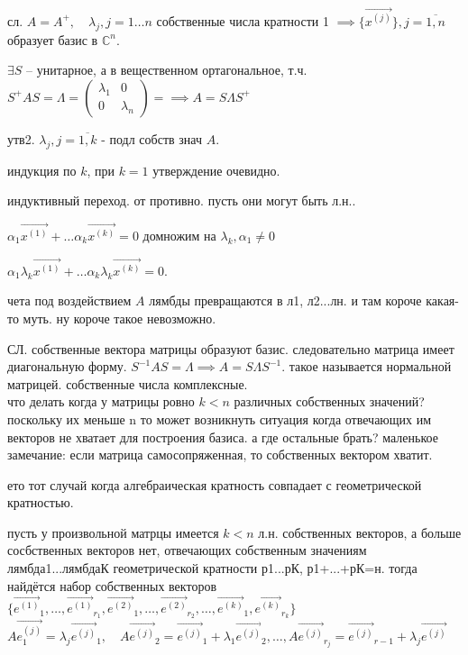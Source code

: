 \documentclass[12pt, a4paper]{article}
\begin{document}
сл. $A = A^+, \quad \lambda_j, j = 1\dotsc n$ собственные числа кратности 1 $\implies \{ \vec{x^{(j)}}\}, j=\overline{1,n}$ образует базис в $\mathbb{C}^n$.

$\exists S $ -- унитарное, а в вещественном ортагональное, т.ч. $S^+AS = \Lambda = \left(\begin{matrix}
\lambda_1 & 0 \\ 0 & \lambda_n
\end{matrix}\right) =\implies A = S\Lambda S^+
$

утв2. $\lambda_j, j=\overline{1, k}$ - подл собств знач $A$. 

индукция по $k$, при $k=1$ утверждение очевидно. 

индуктивный переход. от противно. пусть они могут быть л.н.. 

$\alpha_1 \vec{x^{(1)}} + \dotsc \alpha_k \vec{x^{(k)}} = 0$ домножим на $\lambda_k, \alpha_1 \neq 0$

$\alpha_1 \lambda_k \vec{x^{(1)}} + \dotsc \alpha_k \lambda_k \vec{x^{(k)}} = 0$. 

чета под воздействием $A$ лямбды превращаются в л1, л2...лн. и там короче какая-то муть. ну короче такое невозможно.

СЛ. собственные вектора матрицы образуют базис. следовательно матрица имеет диагональную форму. $S^{-1}AS = \Lambda \implies A = S\Lambda S^{-1}$. такое называется нормальной матрицей. собственные числа комплексные.\\

что делать когда у матрицы ровно $k<n$ различных собственных значений? поскольку их меньше n то может возникнуть ситуация когда отвечающих им векторов не хватает для построения базиса. а где остальные брать? маленькое замечание: если матрица самосопряженная, то собственных вектором хватит.

ето тот случай когда алгебраическая кратность совпадает с геометрической кратностью. 

пусть у произвольной матрцы имеется $k< n$ л.н. собственных векторов, а больше сосбственных векторов нет, отвечающих собственным значениям лямбда1...лямбдаК геометрической кратности р1...рК, р1+...+рК=н. тогда найдётся набор собственных векторов $\{ \vec{e^{(1)}}_1, \dotsc, \vec{e^{(1)}}_{r_1}, \vec{e^{(2)}}_1, \dotsc, \vec{e^{(2)}}_{r_2}, \dotsc, \vec{e^{(k)}}_1, \vec{e^{(k)}}_{r_k} \}$\\

$A \vec{e_1^{(j)}} = \lambda_j \vec{e^{(j)}}_1, \quad A \vec{e^{(j)}}_2 = \vec{e^{(j)}}_1 + \lambda_1 \vec{e^{(j)}}_2, \dotsc, A \vec{e^{(j)}}_{r_j} = \vec{e^{(j)}}_{r-1} + \lambda_j \vec{e^{(j)}}$\\
\end{document}
